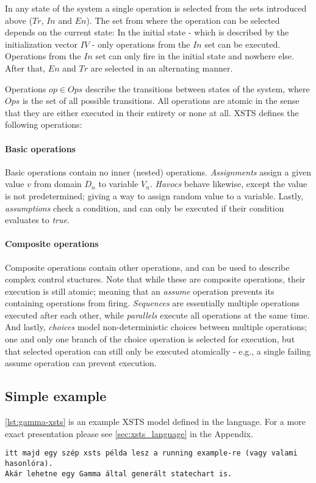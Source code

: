 In any state of the system a single operation is selected from the sets introduced above (\(Tr\), \(In\) and \(En\)). The set from where the operation can be selected depends on the current state: In the initial state - which is described by the initialization vector \(IV\) - only operations from the \(In\) set can be executed. Operations from the \(In\) set can only fire in the initial state and nowhere else. After that, \(En\) and \(Tr\) are selected in an alternating manner.

Operations \(op \in Ops\) describe the transitions between states of the system, where \(Ops\) is the set of all possible transitions. All operations are atomic in the sense that they are either executed in their entirety or none at all. XSTS defines the following operations:

\paragraph{Basic operations}

Basic operations contain no inner (nested) operations. \emph{Assignments} assign a given value \(v\) from domain \(D_n\) to variable \(V_n\). \emph{Havocs} behave likewise, except the value is not predetermined; giving a way to assign random value to a variable. Lastly, \emph{assumptions} check a condition, and can only be executed if their condition evaluates to \emph{true}.

\paragraph{Composite operations}

Composite operations contain other operations, and can be used to describe complex control stuctures. Note that while these are composite operations, their execution is still atomic; meaning that an \emph{assume} operation prevents its containing operations from firing. \emph{Sequences} are essentially multiple operations executed after each other, while \emph{parallels} execute all operations at the same time. And lastly, \emph{choices} model non-deterministic choices between multiple operations; one and only one branch of the choice operation is selected for execution, but that selected operation can still only be executed atomically - e.g., a single failing assume operation can prevent execution.

\subsection{Simple example}

\autoref{lst:gamma-xsts} is an example XSTS model defined in the language. For a more exact presentation please see \autoref{sec:xsts_language} in the Appendix.

\begin{lstlisting}[float,language=xsts, caption={Gamma XSTS Language representing Traffic Controller statechart.}, label={lst:gamma-xsts}]
itt majd egy szép xsts példa lesz a running example-re (vagy valami hasonlóra). 
Akár lehetne egy Gamma által generált statechart is.
\end{lstlisting}
